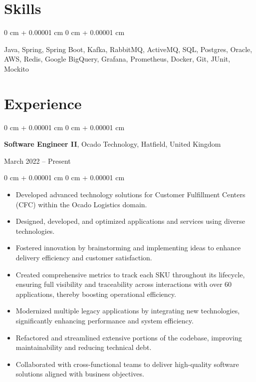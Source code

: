 \documentclass[10pt, letterpaper]{article}
\newenvironment{highlights}{
    \begin{itemize}[
        topsep=0.10 cm,
        parsep=0.10 cm,
        partopsep=0pt,
        itemsep=0pt,
        leftmargin=0 cm + 10pt
    ]
}{
    \end{itemize}
} %
\newenvironment{onecolentry}{
    \begin{adjustwidth}{
        0 cm + 0.00001 cm
    }{
        0 cm + 0.00001 cm
    }
}{
    \end{adjustwidth}
} %
\newenvironment{twocolentry}[2][]{
    \onecolentry
    \def\secondColumn{#2}
    \setcolumnwidth{\fill, 4.5 cm}
    \begin{paracol}{2}
}{
    \switchcolumn \raggedleft \secondColumn
    \end{paracol}
    \endonecolentry
} %
\begin{document}
        \vspace{0.2 cm}
    
    \section{Skills}

    \begin{onecolentry}
        Java, Spring, Spring Boot, Kafka, RabbitMQ, ActiveMQ, SQL, Postgres, Oracle, AWS, Redis, Google BigQuery, Grafana, Prometheus, Docker, Git, JUnit, Mockito
    \end{onecolentry}

    \section{Experience}
        
        \begin{twocolentry}{
            March 2022 – Present
        }
            \textbf{Software Engineer II}, Ocado Technology, Hatfield, United Kingdom
        \end{twocolentry}

        \vspace{0.10 cm}
        \begin{onecolentry}
            \begin{highlights}
                \item Developed advanced technology solutions for Customer Fulfillment Centers (CFC) within the Ocado Logistics domain.
                \item Designed, developed, and optimized applications and services using diverse technologies.
                \item Fostered innovation by brainstorming and implementing ideas to enhance delivery efficiency and customer satisfaction.
                \item Created comprehensive metrics to track each SKU throughout its lifecycle, ensuring full visibility and traceability across interactions with over 60 applications, thereby boosting operational efficiency.
                \item Modernized multiple legacy applications by integrating new technologies, significantly enhancing performance and system efficiency.
                \item Refactored and streamlined extensive portions of the codebase, improving maintainability and reducing technical debt.
                \item Collaborated with cross-functional teams to deliver high-quality software solutions aligned with business objectives.
            \end{highlights}
        \end{onecolentry}
\end{document}

